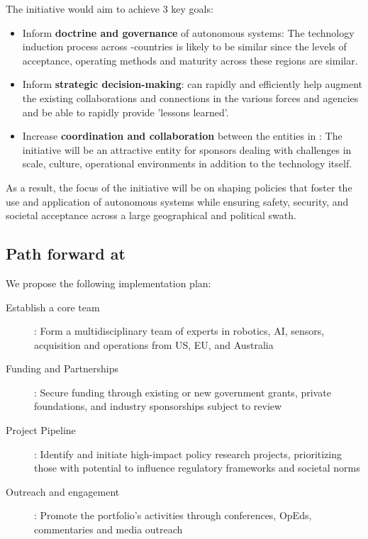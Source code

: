 \documentclass[11pt,letterpaper]{article}
\begin{document}
The initiative would aim to achieve 3 key goals: 

\begin{itemize}

\item Inform \textbf{doctrine and governance} of autonomous systems:
  The technology induction process across \auke-countries is likely to
  be similar since the levels of acceptance, operating methods and
  maturity across these regions are similar.

\item Inform \textbf{strategic decision-making}: \org can rapidly and
  efficiently help augment the existing collaborations and connections
  in the various forces and agencies and be able to rapidly provide
  ’lessons learned’.

\item Increase \textbf{coordination and collaboration} between the
  entities in \auke: The initiative will be an attractive entity for
  sponsors dealing with challenges in scale, culture, operational
  environments in addition to the technology itself.

\end{itemize}

As a result, the focus of the initiative will be on shaping policies
that foster the use and application of autonomous systems while
ensuring safety, security, and societal acceptance across a large
geographical and political swath.


\subsection{Path forward at \org}

We propose the following implementation plan:

\begin{description}

\item[Establish a core team]: Form a multidisciplinary team of \org
  experts in robotics, AI, sensors, acquisition and operations from
  \org US, EU, and Australia

\item[Funding and Partnerships]: Secure funding through existing or
  new government grants, private foundations, and industry
  sponsorships subject to review

\item[Project Pipeline]: Identify and initiate high-impact policy
  research projects, prioritizing those with potential to influence
  regulatory frameworks and societal norms
  
\item[Outreach and engagement]: Promote the portfolio’s activities
  through conferences, OpEds, commentaries and media outreach


\end{description}
\end{document}
